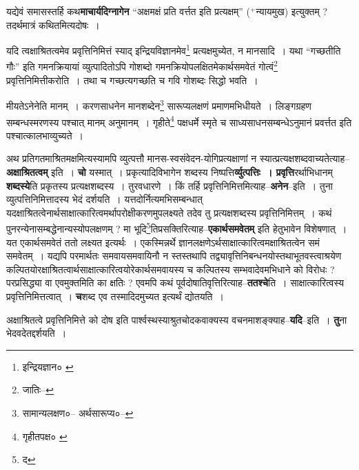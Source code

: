 \documentclass[article,12pt,a4paper]{memoir}
\newcommand{\add}[1]{($^{+}$#1)}
\begin{document}
	  \pstart यद्येवं समासस्तर्हि कथ\textbf{माचार्यदिग्नागेन} “अक्षमक्षं प्रति वर्त्तत इति प्रत्यक्षम्” \add{न्यायमुख} इत्युक्तम् ? तदर्थमात्रं कथितमित्यदोषः ।
	\pend
      \leavevmode{}
	  \bigskip
	  \begingroup
	

	  \pstart यदि त्वक्षाश्रितत्वमेव प्रवृत्तिनिमित्तं स्याद् इन्द्रियविज्ञानमेव\footnote{इन्द्रियज्ञान० \cite{dp-msA} \cite{dp-edP} \cite{dp-edH} \cite{dp-edE}} प्रत्यक्षमुच्येत, न मानसादि । यथा “गच्छतीति गौः” इति गमनक्रियायां व्युत्पादितोऽपि गोशब्दो गमनक्रियोपलक्षितमेकार्थसमवेतं गोत्वं\footnote{जातिः--\cite{dp-msD-n}} प्रवृत्तिनिमित्तीकरोति । तथा च गच्छत्यगच्छति च गवि गोशब्दः सिद्धो भवति ।
	\pend
       

	  \pstart मीयतेऽनेनेति मानम् । करणसाधनेन मानशब्देन\footnote{सामान्यलक्षण०--\cite{dp-msD-n} अर्थसारूप्य०--\cite{dp-msD-n}} सारूप्यलक्षणं प्रमाणमभिधीयते । लिङ्गग्रहण सम्बन्धस्मरणस्य पश्चात् मानम् अनुमानम् । गृहीते\footnote{गृहीतपक्ष० \cite{dp-msB}} पक्षधर्मे स्मृते च साध्यसाधनसम्बन्धेऽनुमानं प्रवर्त्तत इति पश्चात्कालभाव्युच्यते ।
	\pend
      
	  \endgroup
	

	  \pstart अथ प्रतिगतमाश्रितमक्षमित्यस्यामपि व्युत्पत्तौ मानस-स्वसंवेदन-योगिप्रत्यक्षाणां न स्यात्प्रत्यक्षशब्दवाच्यतेत्याह--\textbf{अक्षाश्रितत्वम्} इति । \textbf{चो} यस्मात् । प्रकृत्यादिविभागेन शब्दस्य निष्पत्ति\textbf{र्व्युत्पत्तिः । प्रवृत्ति}रर्थाभिधानम् \textbf{शब्दस्ये}ति प्रकृतस्य प्रत्यक्षशब्दस्य । तुरवधारणे । किं तर्हि प्रवृत्तिनिमित्तमित्याह--\textbf{अनेन}--इति । तुना व्युत्पत्तिनिमित्तादस्य भेदं द\leavevmode{}र्शयति । यत्तदोर्नित्यमभिसम्बन्धात् यदक्षाश्रितत्वेनार्थसाक्षात्कारित्वमर्थापरोक्षीकरणमुपलक्ष्यते तदेव तु प्रत्यक्षशब्दस्य प्रवृत्तिनिमित्तम् । कथं पुनरन्येनासम्बद्धेनान्यस्योपलक्षणम् ? मा भूदि\footnote{द}तिप्रसक्तिरित्याह--\textbf{एकार्थसमवेतम्} इति हेतुभावेन विशेषणात् । यत एकार्थसमवेतं ततो लक्ष्यत इत्यर्थः । एकस्मिन्नर्थे ज्ञानलक्षणेऽर्थसाक्षात्कारित्वमक्षाश्रितत्वेन समं समवेतम् । यद्यपि परमार्थतः समवायसमवायिनौ न स्तस्तथापि तद्व्यावृत्तिनिबन्धनयोस्तथाभूतवस्त्वाश्रयेण कल्पितयोरक्षाश्रितत्वार्थसाक्षात्कारित्वयोरेकार्थसमवायस्य च कल्पितस्य सम्भवादेवमभिधाने को विरोधः ? परप्रसिद्ध्या वा एवमुक्तमिति का क्षतिः ? एवमपि कथं पूर्वदोषातिवृत्तिरित्याह--\textbf{ततश्चे}ति । साक्षात्कारित्वस्य प्रवृत्तिनिमित्तत्वात् । \textbf{च}शब्द एव तस्मादिदमुच्यत इत्यर्थं द्योतयति ।
	\pend
      

	  \pstart अक्षाश्रितत्वे प्रवृत्तिनिमित्ते को दोष इति पार्श्वस्थस्याश्रुतचोदकवाक्यस्य वचनमाशङ्क्याह--\textbf{यदि}--इति । \textbf{तु}ना भेदवदेतद्दर्शयति ।
	\pend
      
\end{document}
